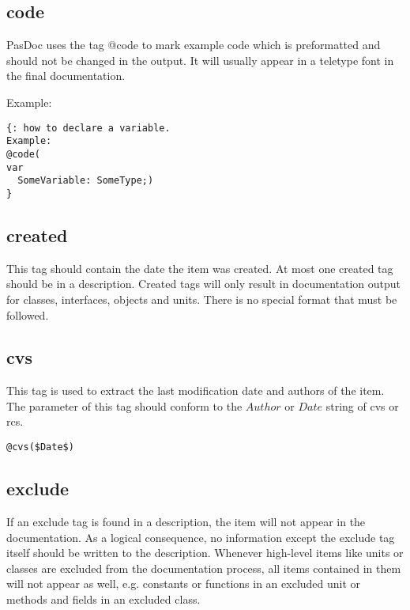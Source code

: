 \documentclass[11pt]{article}
\begin{document}
\subsection{code}

PasDoc uses the tag @code to mark example code which is preformatted and should 
not be changed in the output. It will usually appear in a teletype font in
the final documentation.

Example:
\begin{verbatim}
{: how to declare a variable.
Example:
@code(
var
  SomeVariable: SomeType;)
}
\end{verbatim}


\subsection{created}

This tag should contain the date the item was created.
At most one created tag should be in a description.
Created tags will only result in documentation output for
classes, interfaces, objects and units.
There is no special format that must be followed.

\subsection{cvs}

This tag is used to extract the last modification
date and authors of the item. The parameter of this
tag should conform to the $Author$ or $Date$ string
of cvs or rcs.

\begin{verbatim}
@cvs($Date$)
\end{verbatim}

\subsection{exclude}

If an exclude tag is found in a description, the item will not
appear in the documentation.
As a logical consequence, no information except the
exclude tag itself should be written to the description.
Whenever high-level items like units or classes are excluded from the
documentation process, all items contained in them will not appear as well,
e.g. constants or functions in an excluded unit or methods and fields in
an excluded class.
\end{document}
